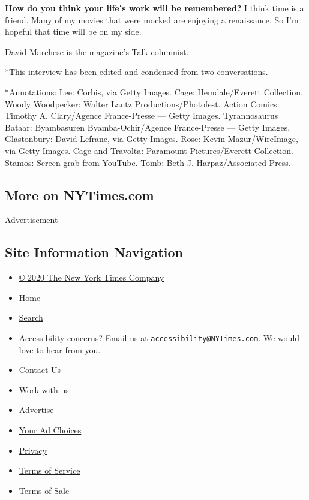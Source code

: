 \textbf{How do you think your life's work will be remembered?} I think
time is a friend. Many of my movies that were mocked are enjoying a
renaissance. So I'm hopeful that time will be on my side.

David Marchese is the magazine's Talk columnist.

*This interview has been edited and condensed from two conversations.

*Annotations: Lee: Corbis, via Getty Images. Cage: Hemdale/Everett
Collection. Woody Woodpecker: Walter Lantz Productions/Photofest. Action
Comics: Timothy A. Clary/Agence France-Presse --- Getty Images.
Tyrannosaurus Bataar: Byambasuren Byamba-Ochir/Agence France-Presse ---
Getty Images. Glastonbury: David Lefranc, via Getty Images. Rose: Kevin
Mazur/WireImage, via Getty Images. Cage and Travolta: Paramount
Pictures/Everett Collection. Stamos: Screen grab from YouTube. Tomb:
Beth J. Harpaz/Associated Press.

\hypertarget{more-on-nytimescom}{%
\subsection{More on NYTimes.com}\label{more-on-nytimescom}}

Advertisement

\hypertarget{site-information-navigation}{%
\subsection{Site Information
Navigation}\label{site-information-navigation}}

\begin{itemize}
\tightlist
\item
  \href{https://help.nytimes3xbfgragh.onion/hc/en-us/articles/115014792127-Copyright-notice}{©
  2020 The New York Times Company}
\item
  \href{https://www.nytimes3xbfgragh.onion}{Home}
\item
  \href{https://www.nytimes3xbfgragh.onion/search/}{Search}
\item
  Accessibility concerns? Email us at
  \href{mailto:accessibility@NYTimes.com}{\nolinkurl{accessibility@NYTimes.com}}.
  We would love to hear from you.
\item
  \href{https://help.nytimes3xbfgragh.onion/hc/en-us/articles/115015385887-Contact-Us}{Contact
  Us}
\item
  \href{https://www.nytco.com/careers/}{Work with us}
\item
  \href{https://nytmediakit.com/}{Advertise}
\item
  \href{https://help.nytimes3xbfgragh.onion/hc/en-us/articles/115014892108-Privacy-policy\#pp}{Your
  Ad Choices}
\item
  \href{https://help.nytimes3xbfgragh.onion/hc/en-us/articles/115014892108-Privacy-policy}{Privacy}
\item
  \href{https://help.nytimes3xbfgragh.onion/hc/en-us/articles/115014893428-Terms-of-service}{Terms
  of Service}
\item
  \href{https://help.nytimes3xbfgragh.onion/hc/en-us/articles/115014893968-Terms-of-sale}{Terms
  of Sale}
\end{itemize}

